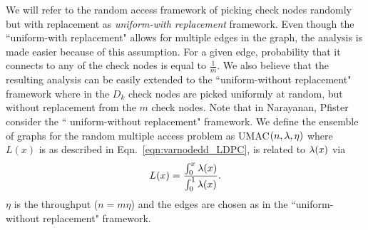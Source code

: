 We will refer to the random access framework of picking check nodes randomly but with replacement as \textit{uniform-with replacement} framework. Even though the ``uniform-with replacement" allows for multiple edges in the graph, the analysis is made easier because of this assumption. For a given edge, probability that it connects to any of the check nodes is equal to $\frac{1}{m}$. We also believe that the resulting analysis can be easily extended to the ``uniform-without replacement" framework where in the $D_{k}$ check nodes are picked uniformly at random, but without replacement from the $m$ check nodes. Note that in Narayanan, Pfister \cite{narayanan2012iterative} consider the `` uniform-without replacement" framework. We define the ensemble of graphs for the random multiple access problem as UMAC$(n,\lambda,\eta)$ where $L(x)$ is as described in Eqn.~\eqref{eqn:varnodedd_LDPC}, is related to $\lambda(x)$ via
\begin{align*}
L(x)=\frac{\int_{0}^{x}\lambda(x)}{\int_{0}^{1}\lambda(x)}.
\end{align*}
 $\eta$ is the throughput ($n=m\eta$) and the edges are chosen as in the ``uniform-without replacement" framework.

